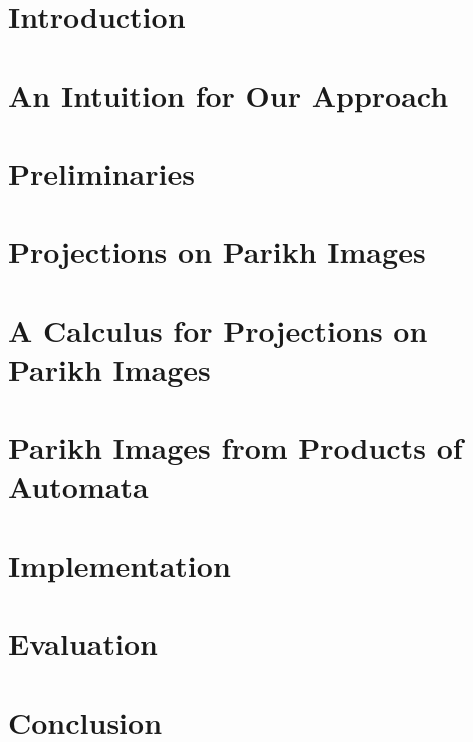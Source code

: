 \documentclass[acmsmall]{acmart}\settopmatter{}
\theoremstyle{definition}
\begin{document}
\section{Introduction}\label{sec:introduction}


\section{An Intuition for Our Approach}\label{sec:intuition}


\section{Preliminaries}\label{sec:preliminaries}


\section{Projections on Parikh Images}\label{sec:generalised}


\section{A Calculus for Projections on Parikh Images}\label{sec:calculus}


\section{Parikh Images from Products of Automata}\label{sec:multiple}


%

\section{Implementation}\label{sec:implementation}


\section{Evaluation}\label{sec:experiments}


\section{Conclusion}

\end{document}
